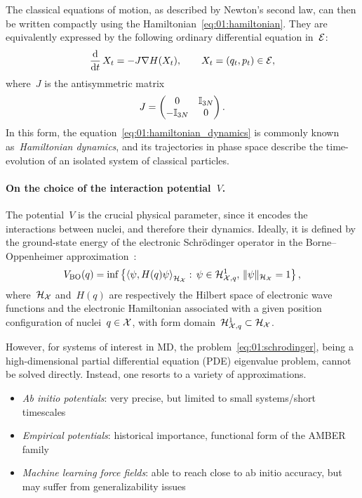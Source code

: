 The classical equations of motion, as described by Newton's second law, can then be written compactly using the Hamiltonian~\eqref{eq:01:hamiltonian}. They are equivalently expressed by the following ordinary differential equation in~$\mathcal{E}$:
\begin{equation}
    \label{eq:01:hamiltonian_dynamics}
    \frac{\mathrm{d}}{\mathrm{d} t}\,X_t = -J\nabla H(X_t),\qquad X_t = (q_t,p_t)\in \mathcal{E},
\end{equation}
where~$J$ is the antisymmetric matrix
\begin{equation}
    \label{eq:01:J}
    J=\begin{pmatrix}
        0&\mathbb{I}_{3N}\\-\mathbb{I}_{3N}&0
    \end{pmatrix}.
\end{equation}
In this form, the equation~\eqref{eq:01:hamiltonian_dynamics} is commonly known as~\textit{Hamiltonian dynamics}, and its trajectories in phase space describe the time-evolution of an isolated system of classical particles.

\paragraph{On the choice of the interaction potential~$V$.}
The potential~$V$ is the crucial physical parameter, since it encodes the interactions between nuclei, and therefore their dynamics. Ideally, it is defined by the ground-state energy of the electronic Schr\"odinger operator in the Borne--Oppenheimer approximation~\cite{BO27}:
\begin{equation}
    \label{eq:01:schrodinger}
    V_{\mathrm{BO}}(q) = \inf\left\{\left\langle\psi, H(q) \psi\right\rangle_{\mathcal H_{\mathcal{X}}}:\,\psi \in \mathcal H^1_{\mathcal{X},q},\,\|\psi\|_{\mathcal H_{\mathcal{X}}}=1\right\},
\end{equation}
where~$\mathcal H_{\mathcal{X}}$ and~$H(q)$ are respectively the Hilbert space of electronic wave functions and the electronic Hamiltonian associated with a given position configuration of nuclei~$q\in\mathcal{X}$, with form domain~$\mathcal H^1_{\mathcal{X},q}\subset \mathcal H_{\mathcal{X}}$.

However, for systems of interest in MD, the problem~\eqref{eq:01:schrodinger}, being a high-dimensional partial differential equation (PDE) eigenvalue problem, cannot be solved directly. Instead, one resorts to a variety of approximations.
\begin{itemize}
    \item{\textit{Ab initio potentials}: very precise, but limited to small systems/short timescales}
    \item{\textit{Empirical potentials}: historical importance, functional form of the AMBER family}
    \item{\textit{Machine learning force fields}: able to reach close to ab initio accuracy, but may suffer from generalizability issues}
\end{itemize}

